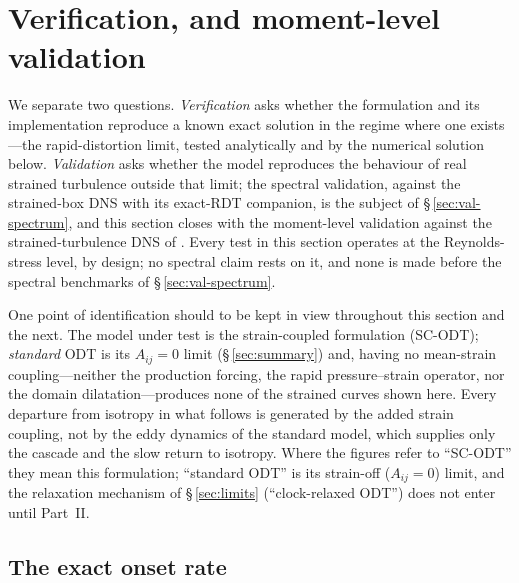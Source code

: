 \documentclass[lineno]{JFM-FLM_Au}
\begin{document}
\section{Verification, and moment-level validation}\label{sec:verification}

We separate two questions. \emph{Verification} asks whether the
formulation and its implementation reproduce a known exact solution in
the regime where one exists---the rapid-distortion limit, tested
analytically and by the numerical solution below. \emph{Validation} asks whether the
model reproduces the behaviour of real strained turbulence outside that
limit; the spectral validation, against the strained-box DNS with its
exact-RDT companion, is the subject of \S\,\ref{sec:val-spectrum}, and
this section closes with the moment-level validation against the
strained-turbulence DNS of \citet{LeeReynolds1985}. Every test in this
section operates at the Reynolds-stress level, by design; no spectral
claim rests on it, and none is made before the spectral benchmarks of
\S\,\ref{sec:val-spectrum}.

One point of identification should to be kept in view throughout this section
and the next. The model under test is the strain-coupled formulation
(SC-ODT); \emph{standard} ODT is its $A_{ij}=0$ limit
(\S\,\ref{sec:summary}) and, having no mean-strain coupling---neither
the production forcing, the rapid pressure--strain operator, nor the
domain dilatation---produces none of the strained curves shown here.
Every departure from isotropy in what follows is generated by the added
strain coupling, not by the eddy dynamics of the standard model, which
supplies only the cascade and the slow return to isotropy. Where the
figures refer to ``SC-ODT'' they mean this formulation; ``standard ODT''
is its strain-off ($A_{ij}=0$) limit, and the relaxation mechanism of
\S\,\ref{sec:limits} (``clock-relaxed ODT'') does not enter until
Part~II.

\subsection{The exact onset rate}\label{sec:onset}
\end{document}
